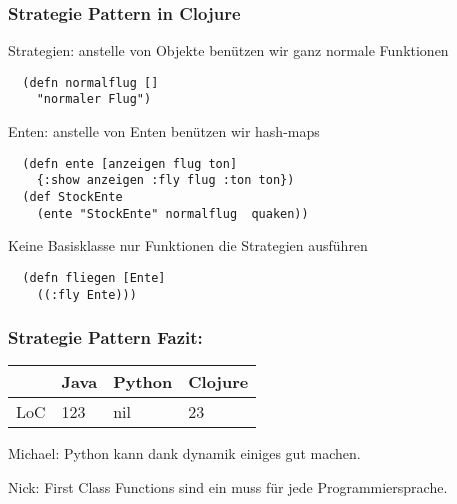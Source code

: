 \documentclass[compress, blue]{beamer}
\begin{document}

\begin{frame}[fragile]\frametitle{Strategie Pattern in Clojure}
  
Strategien: anstelle von Objekte benützen wir ganz normale Funktionen
\begin{lstlisting}
  (defn normalflug []
    "normaler Flug")
\end{lstlisting} 
\pause
Enten: anstelle von Enten  benützen wir hash-maps
\begin{lstlisting}
  (defn ente [anzeigen flug ton]
    {:show anzeigen :fly flug :ton ton})
  (def StockEnte 
    (ente "StockEnte" normalflug  quaken))
\end{lstlisting}
\pause
Keine Basisklasse nur Funktionen die Strategien ausführen 
\begin{lstlisting}
  (defn fliegen [Ente]
    ((:fly Ente)))
\end{lstlisting} 
\pause
\end{frame}





\begin{frame}\frametitle{Strategie Pattern Fazit:}
  \begin{tabular}{l | l l l}
     & Java &  Python & Clojure  \\
     \hline
    LoC & 123 &  nil & 23  \\
  \end{tabular}
  \vspace{.5cm}

  \begin{block}{Michael:}
    Python kann dank dynamik einiges gut machen.
  \end{block}

  \begin{block}{Nick: }
    First Class Functions sind ein muss für jede Programmiersprache.
  \end{block}
\end{frame}
\end{document}
